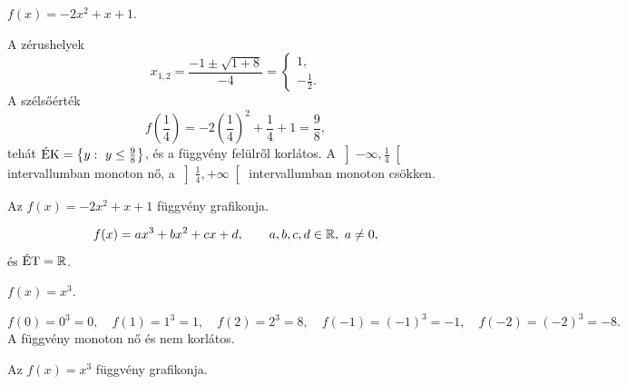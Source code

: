 \documentclass[11pt]{article}
\begin{document}
\begin{exbox}
\begin{example}
$f(x)=-2x^{2}+x+1$.
\end{example}
\end{exbox}
\begin{solution}
A zérushelyek
\[
x_{1,2}=\frac{-1\pm\sqrt{1+8}}{-4}=
\begin{cases}
1,\\
-\tfrac{1}{2} .
\end{cases}
\]
A szélsőérték
\[
f\!\left(\frac{1}{4}\right)=-2\left(\frac{1}{4}\right)^{2}+\frac{1}{4}+1=\frac{9}{8},
\]
tehát $\EK=\left\{y:\ y\le \tfrac{9}{8}\right\}$, és a függvény felülről korlátos. A
$\left]-\infty, \tfrac{1}{4}\right[$ intervallumban monoton nő, a
$\left]\tfrac{1}{4}, +\infty\right[$ intervallumban monoton csökken.

\begin{notefig}{Az $f(x)=-2x^{2}+x+1$ függvény grafikonja.}
\end{notefig}
\end{solution}

\begin{defbox}
\begin{definition}
\[
f(x)=ax^{3}+bx^{2}+cx+d,\qquad a, b, c, d\in\R,\ a\neq 0,
\]
és $\ET=\R$.
\end{definition}
\end{defbox}

\begin{exbox}
\begin{example}
$f(x)=x^{3}$.
\end{example}
\end{exbox}
\begin{solution}
\[
f(0)=0^{3}=0,\quad f(1)=1^{3}=1,\quad f(2)=2^{3}=8,\quad
f(-1)=(-1)^{3}=-1,\quad f(-2)=(-2)^{3}=-8 .
\]
A függvény monoton nő és nem korlátos.

\begin{notefig}{Az $f(x)=x^{3}$ függvény grafikonja.}
\end{notefig}
\end{solution}
\end{document}
